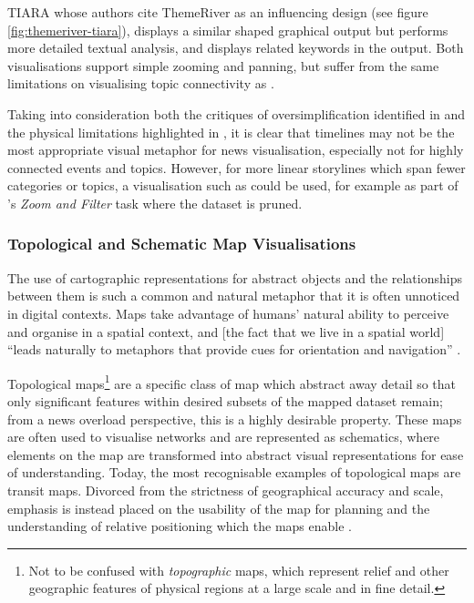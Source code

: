 TIARA \citep{InteractiveTopicBasedVisualTextSummarizationAndAnalysis} whose authors cite ThemeRiver as an influencing design (see figure \ref{fig:themeriver-tiara}), displays a similar shaped graphical output but performs more detailed textual analysis, and displays related keywords in the output. Both visualisations support simple zooming and panning, but suffer from the same limitations on visualising topic connectivity as \citep{TimeSets}.

Taking into consideration both the critiques of  oversimplification identified in \citep{SchemaLine} and the physical limitations highlighted in \citep{TimeSets, ThemeRiver}, it is clear that timelines may not be the most appropriate visual metaphor for news visualisation, especially not for highly connected events and topics. However, for more linear storylines which span fewer categories or topics, a visualisation such as \citep{SchemaLine} could be used, for example as part of \citeauthor{TheEyesHaveIt}'s \textit{Zoom and Filter} task where the dataset is pruned.

\subsubsection{Topological and Schematic Map Visualisations}

The use of cartographic representations for abstract objects and the relationships between them is such a common and natural metaphor that it is often unnoticed in digital contexts. Maps take advantage of humans' natural ability to perceive and organise in a spatial context, and [the fact that we live in a spatial world] ``leads naturally to metaphors that provide cues for orientation and navigation'' \citep[p.2]{InformationCartographyUsingGIS}.

Topological maps\footnote{Not to be confused with \textit{topographic} maps, which represent relief and other geographic features of physical regions at a large scale and in fine detail.} are a specific class of map which abstract away detail so that only significant features within desired subsets of the mapped dataset remain; from a news overload perspective, this is a highly desirable property. These maps are often used to visualise networks and are represented as schematics, where elements on the map are transformed into abstract visual representations for ease of understanding. Today, the most recognisable examples of topological maps are transit maps. Divorced from the strictness of geographical accuracy and scale, emphasis is instead placed on the usability of the map for planning and the understanding of relative positioning which the maps enable \citep{TheInfluenceOfMapDesignOnRouteChoice}.

